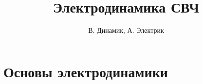 \documentclass[a4paper, oneside, 12pt]{book}
\begin{document}
\title{Электродинамика СВЧ}
\author{В. Динамик, А. Электрик}
\maketitle

\tableofcontents

\part{Основы электродинамики}



\end{document}
